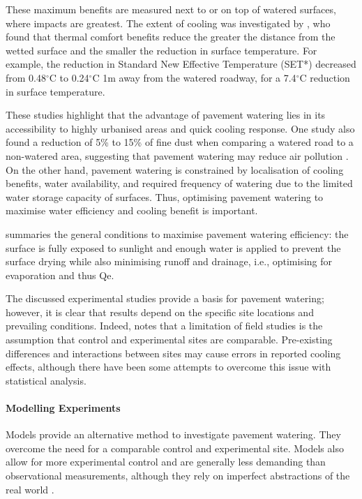 \documentclass[final,3p,times,authoryear]{elsarticle}
\begin{document}
These maximum benefits are measured next to or on top of watered surfaces, where impacts are greatest. The extent of cooling was investigated by \cite{Takebayashi2021}, who found that thermal comfort benefits reduce the greater the distance from the wetted surface and the smaller the reduction in surface temperature. For example, the reduction in Standard New Effective Temperature (SET*) decreased from 0.48$^{\circ}$C to 0.24$^{\circ}$C 1m away from the watered roadway, for a 7.4$^{\circ}$C reduction in surface temperature.

These studies highlight that the advantage of pavement watering lies in its accessibility to highly urbanised areas and quick cooling response. One study also found a reduction of 5\% to 15\% of fine dust when comparing a watered road to a non-watered area, suggesting that pavement watering may reduce air pollution \citep{Kim2014a}. On the other hand, pavement watering is constrained by localisation of cooling benefits, water availability, and required frequency of watering due to the limited water storage capacity of surfaces. Thus, optimising pavement watering to maximise water efficiency and cooling benefit is important.

\cite{Hendel2020} summaries the general conditions to maximise pavement watering efficiency: the surface is fully exposed to sunlight and enough water is applied to prevent the surface drying while also minimising runoff and drainage, i.e., optimising for evaporation and thus \gls{Qe}.

The discussed experimental studies provide a basis for pavement watering; however, it is clear that results depend on the specific site locations and prevailing conditions. Indeed, \cite{Hendel2016} notes that a limitation of field studies is the assumption that control and experimental sites are comparable. Pre-existing differences and interactions between sites may cause errors in reported cooling effects, although there have been some attempts to overcome this issue with statistical analysis.

\paragraph{Modelling Experiments}\label{sec:appendix7.1.4}

Models provide an alternative method to investigate pavement watering. They overcome the need for a comparable control and experimental site. Models also allow for more experimental control and are generally less demanding than observational measurements, although they rely on imperfect abstractions of the real world \citep{Krayenhoff2021}.
\end{document}
